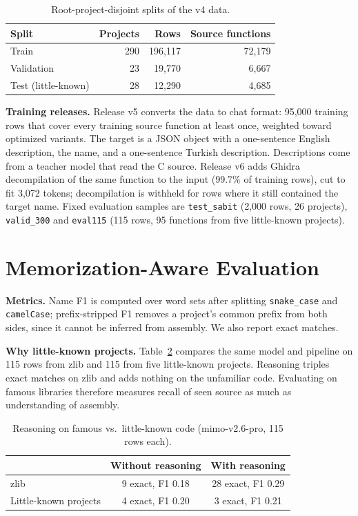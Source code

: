 \documentclass[conference]{IEEEtran}
\begin{document}
\begin{table}[t]
\centering
\caption{Root-project-disjoint splits of the v4 data.}
\label{tab:splits}
\begin{tabular}{lrrr}
\toprule
Split & Projects & Rows & Source functions \\
\midrule
Train & 290 & 196,117 & 72,179 \\
Validation & 23 & 19,770 & 6,667 \\
Test (little-known) & 28 & 12,290 & 4,685 \\
\bottomrule
\end{tabular}
\end{table}

\textbf{Training releases.} Release v5 converts the data to chat format: 95,000 training rows that cover every training source function at least once, weighted toward optimized variants. The target is a JSON object with a one-sentence English description, the name, and a one-sentence Turkish description. Descriptions come from a teacher model that read the C source. Release v6 adds Ghidra decompilation of the same function to the input (99.7\% of training rows), cut to fit 3,072 tokens; decompilation is withheld for rows where it still contained the target name. Fixed evaluation samples are \texttt{test\_sabit} (2,000 rows, 26 projects), \texttt{valid\_300} and \texttt{eval115} (115 rows, 95 functions from five little-known projects).

\section{Memorization-Aware Evaluation}
\textbf{Metrics.} Name F1 is computed over word sets after splitting \texttt{snake\_case} and \texttt{camelCase}; prefix-stripped F1 removes a project's common prefix from both sides, since it cannot be inferred from assembly. We also report exact matches.

\textbf{Why little-known projects.} Table~\ref{tab:memo} compares the same model and pipeline on 115 rows from zlib and 115 from five little-known projects. Reasoning triples exact matches on zlib and adds nothing on the unfamiliar code. Evaluating on famous libraries therefore measures recall of seen source as much as understanding of assembly.

\begin{table}[t]
\centering
\caption{Reasoning on famous vs.\ little-known code (mimo-v2.6-pro, 115 rows each).}
\label{tab:memo}
\begin{tabular}{lcc}
\toprule
 & Without reasoning & With reasoning \\
\midrule
zlib & 9 exact, F1 0.18 & 28 exact, F1 0.29 \\
Little-known projects & 4 exact, F1 0.20 & 3 exact, F1 0.21 \\
\bottomrule
\end{tabular}
\end{table}
\end{document}
